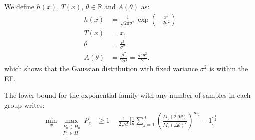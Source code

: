 We define $h(x)$, $T(x)$, $\theta \in \mathbb{R}$ and $A(\theta)$ as:
\begin{align*}
    h(x) &=\frac{1}{\sqrt{2 \pi \sigma^2}} \exp \left(-\frac{x^2}{2\sigma^2}\right)\\
    T(x) & = x,\\
    \theta &= \frac{\mu}{\sigma^2}\\
    A(\theta)& = \frac{\mu^2}{2\sigma^2} = \frac{\sigma^2\theta^2}{2}. 
\end{align*}
which shows that the Gaussian distribution with fixed variance $\sigma^2$ is within the EF.

\begin{proposition}\label{prop:lower_bound_exponential_fam} The lower bound for the exponential family with any number of samples in each group writes:
\begin{align*}
      \min _{\Psi} 
    \max _{\substack{P_0 \in H_0 \\ P_1 \in H_1}}
        P_e 
        &\geq 1 - \frac{1}{2\sqrt{d}} 
        \Bigg[ \frac{1}{d} \sum_{j=1}^d
            \left(\frac{M_p(2\Delta\theta)}{M_p(\Delta \theta)^2}\right)^{m_j}
            -
            1
            \Bigg]^{\frac{1}{2}}
\end{align*}

\end{proposition}

